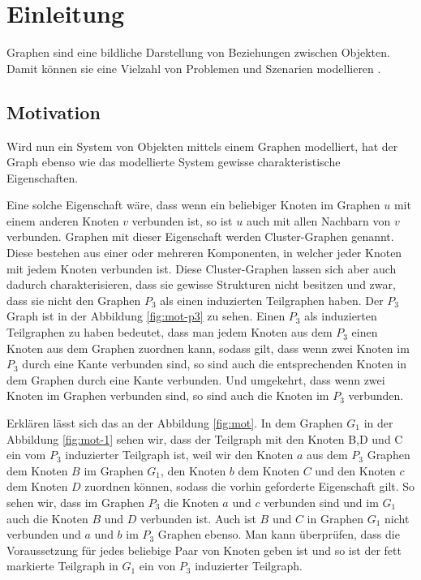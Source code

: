 \documentclass[12pt,a4paper,onecolumn,oneside,titlepage]{article}
\begin{document}
\section{Einleitung}

Graphen sind eine bildliche Darstellung von Beziehungen zwischen Objekten. Damit können sie eine Vielzahl von Problemen und Szenarien modellieren \cite{Nastos06}.

\subsection{Motivation}
\label{sec:mot}
Wird nun ein System von Objekten mittels einem Graphen modelliert, hat der Graph ebenso wie das modellierte System gewisse charakteristische Eigenschaften.

Eine solche Eigenschaft wäre, dass wenn ein beliebiger Knoten im Graphen $u$ mit einem anderen Knoten $v$ verbunden ist, so ist $u$ auch mit allen Nachbarn von $v$ verbunden. Graphen mit dieser Eigenschaft werden Cluster-Graphen  genannt. Diese bestehen aus einer oder mehreren Komponenten, in welcher jeder Knoten mit jedem Knoten verbunden ist.
Diese Cluster-Graphen lassen sich aber auch dadurch charakterisieren, dass sie gewisse Strukturen nicht besitzen und zwar, dass sie nicht den Graphen $P_3$ als einen induzierten Teilgraphen haben. Der $P_3$ Graph ist in der Abbildung \ref{fig:mot-p3} zu sehen.
Einen $P_3$ als induzierten Teilgraphen zu haben bedeutet, dass man jedem Knoten aus dem $P_3$ einen Knoten aus dem Graphen zuordnen kann, sodass gilt, dass wenn zwei Knoten im $P_3$ durch eine Kante verbunden sind, so sind auch die entsprechenden Knoten in dem Graphen durch eine Kante verbunden. Und umgekehrt, dass wenn zwei Knoten im Graphen verbunden sind, so sind auch die Knoten im $P_3$ verbunden.
 
Erklären lässt sich das an der Abbildung \ref{fig:mot}.
In dem Graphen $G_1$ in der Abbildung \ref{fig:mot-1} sehen wir, dass der Teilgraph mit den Knoten B,D und C ein vom $P_3$ induzierter Teilgraph ist, weil wir den Knoten $a$ aus dem $P_3$ Graphen dem Knoten $B$ im Graphen $G_1$, den Knoten $b$ dem Knoten $C$ und den Knoten $c$ dem Knoten $D$ zuordnen können, sodass die vorhin geforderte Eigenschaft gilt.
So sehen wir, dass im Graphen $P_3$ die Knoten $a$ und $c$ verbunden sind und im  
$G_1$ auch die Knoten $B$ und $D$ verbunden ist. Auch ist $B$ und $C$ in Graphen $G_1$ nicht verbunden und $a$ und $b$ im $P_3$ Graphen ebenso.  Man kann überprüfen, dass die Voraussetzung für jedes beliebige Paar von Knoten geben ist und so ist der fett markierte Teilgraph in $G_1$ ein von $P_3$ induzierter Teilgraph. 
\end{document}
